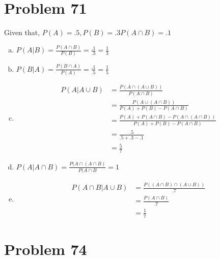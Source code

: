 \documentclass{article}
\begin{document}
\section*{Problem 71}
    Given that, $P(A) = .5, P(B) = .3 P(A \cap B) = .1$
    \begin{enumerate}[a)]
        \item $P(A|B) = \frac{P(A \cap B)}{P(B)} = \frac{.1}{.3} = \frac{1}{3}$
        \item $P(B|A) = \frac{P(B \cap A)}{P(A)} = \frac{.1}{.5} = \frac{1}{5}$
        \item \begin{align*}
                P(A|A \cup B) &= \frac{P(A \cap (A \cup B))}{P(A \cap B)}\\[.2cm]
                              &= \frac{P(A \cup (A \cap B))}{P(A) + P(B) - P(A \cap B)}\\[.2cm]
                              &= \frac{P(A) + P(A \cap B) - P(A \cap (A \cap B))}{P(A) + P(B) - P(A \cap B)}\\[.2cm]
                              &= \frac{.5}{.5 + .3 - .1}\\[.2cm]
                              &= \frac{5}{7}
              \end{align*}
        \item $P(A|A \cap B) = \frac{P(A \cap (A \cap B)}{P(A \cap B} = 1$
        \item \begin{align*}
                P(A \cap B | A \cup B) &= \frac{P((A \cap B) \cap (A \cup B))}{.7}\\[.2cm]
                                       &= \frac{P(A \cap B)}{.7}\\
                                       &= \frac{1}{7}
              \end{align*}
    \end{enumerate}
    
\section*{Problem 74}
    \
\end{document}
